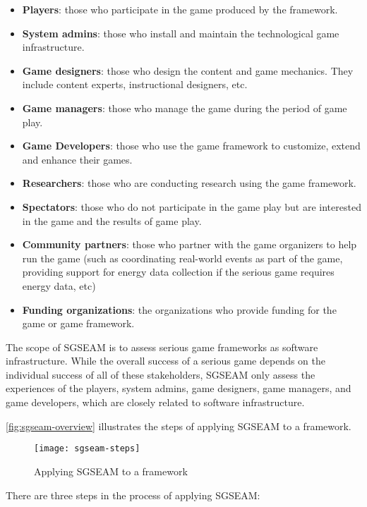 \begin{itemize}
\item \textbf{Players}: those who participate in the game produced by the framework.
\item \textbf{System admins}: those who install and maintain the technological game infrastructure.
\item \textbf{Game designers}: those who design the content and game mechanics. They include  content experts, instructional designers, etc.
\item \textbf{Game managers}: those who manage the game during the period of game play.
\item \textbf{Game Developers}: those who use the game framework to customize, extend and enhance their games.
\item \textbf{Researchers}: those who are conducting research using the game framework.
\item \textbf{Spectators}: those who do not participate in the game play but are interested in the game and the results of game play. 
\item \textbf{Community partners}: those who partner with the game organizers to help run the game (such as coordinating real-world events as part of the game, providing support for energy data
  collection if the serious game requires energy data, etc) 
\item \textbf{Funding organizations}: the organizations who provide funding for the game or game framework.
\end{itemize}

The scope of SGSEAM is to assess serious game frameworks as software infrastructure. While
the overall success of a serious game depends on the individual success of all of these
stakeholders, SGSEAM only assess the experiences of the players, system admins, game designers, game managers, and game developers, which are closely related to software infrastructure. 

\autoref{fig:sgseam-overview} illustrates the steps of applying SGSEAM to a framework.

\begin{figure}[ht!]
  \center
  \texttt{[image: sgseam-steps]}
  \caption{Applying SGSEAM to a framework}
  \label{fig:sgseam-overview}
\end{figure}

There are three steps in the process of applying SGSEAM:


